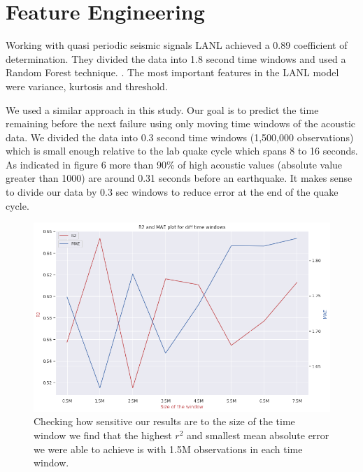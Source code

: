 \documentclass[]{llncs} %
\begin{document}
\section{Feature Engineering}
Working with quasi periodic seismic signals LANL achieved a 0.89 coefficient of determination. They divided the data into 1.8 second time windows and used a Random Forest technique. \cite{Bertrand}. The most important features in the LANL model were variance, kurtosis and threshold. \par
We used a similar approach in this study. Our goal is to predict the time remaining before the next failure using only moving time windows of the acoustic data. We divided the data into 0.3 second time windows (1,500,000 observations) which is small enough relative to the lab quake cycle which spans 8 to 16 seconds. As indicated in figure 6 more than 90\% of high acoustic values (absolute value greater than 1000) are around 0.31 seconds before an earthquake. It makes sense to divide our data by 0.3 sec windows to reduce error at the end of the quake cycle. 

\begin{figure}
	\centering
	\includegraphics[width=.9\linewidth]{rSquaredandMAE}
	\caption{Checking how sensitive our results are to the size of the time window we find that the highest $r^2$ and smallest mean absolute error we were able to achieve is with 1.5M observations in each time window.}
	\label{fig:rSquaredandMAE}
\end{figure}
\end{document}
